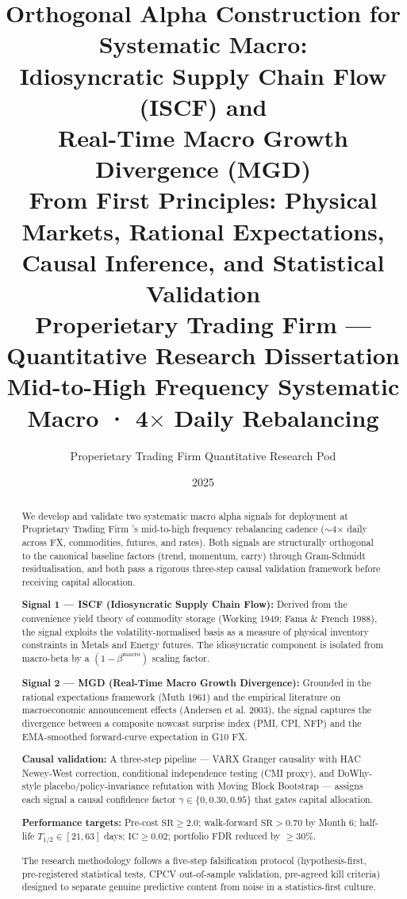 \documentclass[12pt,a4paper]{article}
\title{
  \textbf{Orthogonal Alpha Construction for Systematic Macro:\\[0.4em]
  Idiosyncratic Supply Chain Flow (ISCF) and\\
  Real-Time Macro Growth Divergence (MGD)}\\[0.8em]
  \large From First Principles: Physical Markets, Rational Expectations,\\
  Causal Inference, and Statistical Validation\\[1em]
  \normalsize Properietary Trading Firm — Quantitative Research Dissertation\\
  \normalsize Mid-to-High Frequency Systematic Macro · 4$\times$ Daily Rebalancing
}
\author{Properietary Trading Firm Quantitative Research Pod}
\date{2025}
\begin{document}
\maketitle\thispagestyle{fancy}

\begin{abstract}
We develop and validate two systematic macro alpha signals for deployment at Proprietary Trading Firm 's mid-to-high frequency rebalancing cadence ($\sim$4$\times$ daily across FX, commodities, futures, and rates). Both signals are structurally orthogonal to the canonical baseline factors (trend, momentum, carry) through Gram-Schmidt residualisation, and both pass a rigorous three-step causal validation framework before receiving capital allocation.

\textbf{Signal 1 — ISCF (Idiosyncratic Supply Chain Flow):} Derived from the convenience yield theory of commodity storage (Working 1949; Fama \& French 1988), the signal exploits the volatility-normalised basis as a measure of physical inventory constraints in Metals and Energy futures. The idiosyncratic component is isolated from macro-beta by a $(1-\beta^{\text{macro}})$ scaling factor.

\textbf{Signal 2 — MGD (Real-Time Macro Growth Divergence):} Grounded in the rational expectations framework (Muth 1961) and the empirical literature on macroeconomic announcement effects (Andersen et al. 2003), the signal captures the divergence between a composite nowcast surprise index (PMI, CPI, NFP) and the EMA-smoothed forward-curve expectation in G10 FX.

\textbf{Causal validation:} A three-step pipeline — VARX Granger causality with HAC Newey-West correction, conditional independence testing (CMI proxy), and DoWhy-style placebo/policy-invariance refutation with Moving Block Bootstrap --- assigns each signal a causal confidence factor $\gamma \in \{0, 0.30, 0.95\}$ that gates capital allocation.

\textbf{Performance targets:} Pre-cost $\text{SR} \geq 2.0$; walk-forward $\text{SR} > 0.70$ by Month 6; half-life $T_{1/2} \in [21, 63]$ days; $\text{IC} \geq 0.02$; portfolio FDR reduced by $\geq 30\%$.

The research methodology follows a five-step falsification protocol (hypothesis-first, pre-registered statistical tests, CPCV out-of-sample validation, pre-agreed kill criteria) designed to separate genuine predictive content from noise in a statistics-first culture.
\end{abstract}
\end{document}
